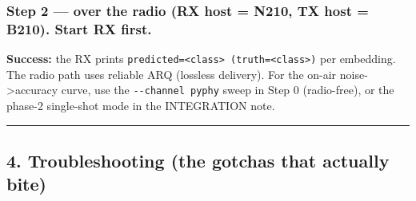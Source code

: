 \documentclass[
  9.5pt,
]{article}
\newenvironment{Shaded}{\begin{snugshade}}{\end{snugshade}}
\newcommand{\AttributeTok}[1]{\textcolor[rgb]{0.77,0.63,0.00}{#1}}
\newcommand{\CommentTok}[1]{\textcolor[rgb]{0.56,0.35,0.01}{\textit{#1}}}
\newcommand{\ExtensionTok}[1]{#1}
\newcommand{\NormalTok}[1]{#1}
\newcommand{\VariableTok}[1]{\textcolor[rgb]{0.00,0.00,0.00}{#1}}
\begin{document}
\hypertarget{step-2--over-the-radio-rx-host--n210-tx-host--b210-start-rx-first}{%
\subsubsection{Step 2 --- over the radio (RX host = N210, TX host =
B210). Start RX
first.}\label{step-2--over-the-radio-rx-host--n210-tx-host--b210-start-rx-first}}

\begin{Shaded}
\end{Shaded}

\textbf{Success:} the RX prints
\texttt{predicted=\textless{}class\textgreater{}\ (truth=\textless{}class\textgreater{})}
per embedding. The radio path uses reliable ARQ (lossless delivery). For
the on-air noise-\textgreater accuracy curve, use the
\texttt{-\/-channel\ pyphy} sweep in Step 0 (radio-free), or the phase-2
single-shot mode in the INTEGRATION note.

\begin{center}\rule{0.5\linewidth}{0.5pt}\end{center}

\hypertarget{4-troubleshooting-the-gotchas-that-actually-bite}{%
\subsection{4. Troubleshooting (the gotchas that actually
bite)}\label{4-troubleshooting-the-gotchas-that-actually-bite}}
\end{document}

